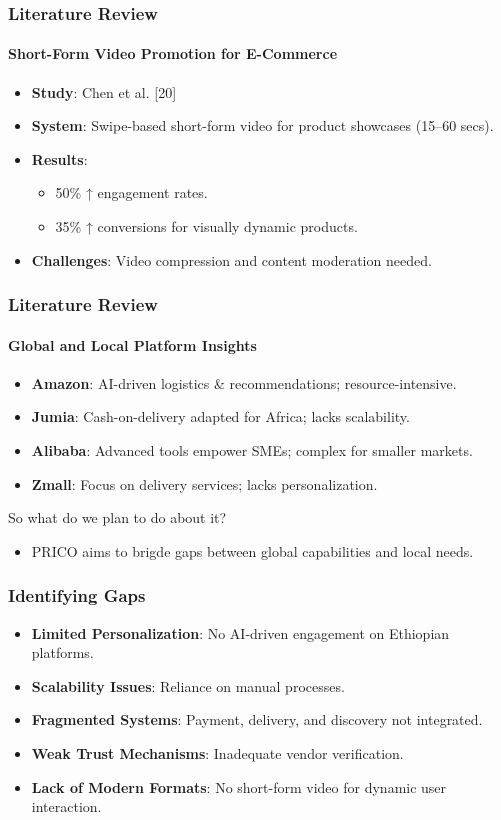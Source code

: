 \documentclass{beamer}
\begin{document}
\begin{frame}
	\frametitle{Literature Review}
	\framesubtitle{Short-Form Video Promotion for E-Commerce}
	\begin{itemize}
		\item \textbf{Study}: Chen et al. [20]
		\item \textbf{System}: Swipe-based short-form video for product showcases (15–60 secs).
		\item \textbf{Results}:
		      \begin{itemize}
			      \item 50\% ↑ engagement rates.
			      \item 35\% ↑ conversions for visually dynamic products.
		      \end{itemize}
		\item \textbf{Challenges}: Video compression and content moderation needed.
	\end{itemize}
\end{frame}

\begin{frame}
	\frametitle{Literature Review}
	\framesubtitle{Global and Local Platform Insights}
	\begin{itemize}
		\item \textbf{Amazon}: AI-driven logistics & recommendations; resource-intensive.
		\item \textbf{Jumia}: Cash-on-delivery adapted for Africa; lacks scalability.
		\item \textbf{Alibaba}: Advanced tools empower SMEs; complex for smaller markets.
		\item \textbf{Zmall}: Focus on delivery services; lacks personalization.
	\end{itemize}
	So what do we plan to do about it?
	\begin{itemize}
		\item PRICO aims to brigde gaps between global capabilities and local needs.
	\end{itemize}
\end{frame}

\begin{frame}
	\frametitle{Identifying Gaps}
	\begin{itemize}
		\item \textbf{Limited Personalization}: No AI-driven engagement on Ethiopian platforms.
		\item \textbf{Scalability Issues}: Reliance on manual processes.
		\item \textbf{Fragmented Systems}: Payment, delivery, and discovery not integrated.
		\item \textbf{Weak Trust Mechanisms}: Inadequate vendor verification.
		\item \textbf{Lack of Modern Formats}: No short-form video for dynamic user interaction.
	\end{itemize}
\end{frame}
\end{document}
